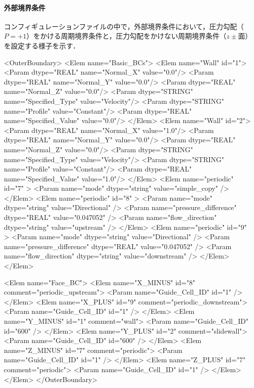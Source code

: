 \paragraph{外部境界条件}コンフィギュレーションファイルの中で，外部境界条件において，圧力勾配（$P=+1$）をかける周期境界条件と，圧力勾配をかけない周期境界条件（$z\pm$面）を設定する様子を示す．
{\small
\begin{program}
    <OuterBoundary>
      <Elem name="Basic_BCs">
        <Elem name="Wall" id="1">
            <Param dtype="REAL" name="Normal_X" value="0.0"/>
            <Param dtype="REAL" name="Normal_Y" value="0.0"/>
            <Param dtype="REAL" name="Normal_Z" value="0.0"/>
            <Param dtype="STRING" name="Specified_Type" value="Velocity"/>
            <Param dtype="STRING" name="Profile" value="Constant"/>
            <Param dtype="REAL" name="Specified_Value" value="0.0"/>
        </Elem>
        <Elem name="Wall" id="2">
            <Param dtype="REAL" name="Normal_X" value="1.0"/>
            <Param dtype="REAL" name="Normal_Y" value="0.0"/>
            <Param dtype="REAL" name="Normal_Z" value="0.0"/>
            <Param dtype="STRING" name="Specified_Type" value="Velocity"/>
            <Param dtype="STRING" name="Profile" value="Constant"/>
            <Param dtype="REAL" name="Specified_Value" value="1.0"/>
        </Elem>
        <Elem name="periodic" id="7" >
          <Param name="mode" dtype="string" value="simple_copy" />
        </Elem>
        <Elem name="periodic" id="8" >
          <Param name="mode" dtype="string" value="Directional" />
          <Param name="pressure_difference" dtype="REAL" value="0.047052" />
          <Param name="flow_direction" dtype="string" value="upstream" />
        </Elem>
        <Elem name="periodic" id="9" >
          <Param name="mode" dtype="string" value="Directional" />
          <Param name="pressure_difference" dtype="REAL" value="0.047052" />
          <Param name="flow_direction" dtype="string" value="downstream" />
        </Elem>
      </Elem>
	
      <Elem name="Face_BC">
        <Elem name="X_MINUS" id="8" comment="periodic_upstream">
          <Param name="Guide_Cell_ID" id="1" />
        </Elem>
        <Elem name="X_PLUS"  id="9" comment="periodic_downstream">
          <Param name="Guide_Cell_ID" id="1" />
        </Elem>
        <Elem name="Y_MINUS" id="1" comment="wall">
          <Param name="Guide_Cell_ID" id="600" />
        </Elem>
        <Elem name="Y_PLUS"  id="2" comment="slidewall">
          <Param name="Guide_Cell_ID" id="600" />
        </Elem>
        <Elem name="Z_MINUS" id="7" comment="periodic">
          <Param name="Guide_Cell_ID" id="1" />
        </Elem>
        <Elem name="Z_PLUS"  id="7" comment="periodic">
          <Param name="Guide_Cell_ID" id="1" />
        </Elem>
      </Elem>
    </OuterBoundary>
\end{program}
}

